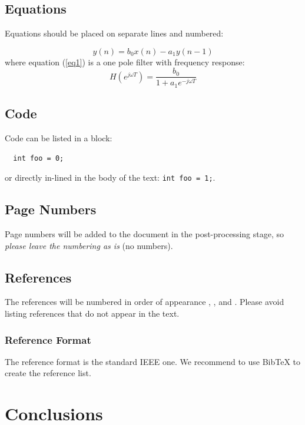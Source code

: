 \documentclass[twoside,a4paper]{article}
\begin{document}
\subsection{Equations}

Equations should be placed on separate lines and numbered:

\begin{equation}
	y(n)=b_0x(n)-a_1y(n-1)
	\label{eq1}
	\end{equation}
	where equation (\ref{eq1}) is a one pole filter with frequency response:
	\begin{equation}
	H(e^{j \omega T}) = \frac{b_0}{1+a_1e^{-j \omega T}}
	\label{eq2}
\end{equation}

\subsection{Code}

Code can be listed in a block:

\begin{lstlisting}
  int foo = 0;
\end{lstlisting}
\noindent
or directly in-lined in the body of the text: \lstinline{int foo = 1;}.

\subsection{Page Numbers}

Page numbers will be added to the document in the post-processing stage, so
{\em please leave the numbering as is} (no numbers).


\subsection{References}

The references will be numbered in order of appearance \cite{Sal89},
\cite{Spa72}, \cite{MosWal64} and \cite{Kay86}. Please avoid listing
references that do not appear in the text.

\subsubsection{Reference Format}

The reference format is the standard IEEE one. We recommend to use BibTeX to
create the reference list.

\section{Conclusions}
\end{document}
